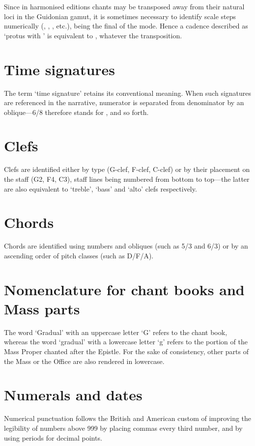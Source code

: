 Since in harmonised editions chants may be transposed away from their natural loci in the Guidonian gamut, it is sometimes necessary to identify scale steps numerically (, , , etc.),  being the final of the mode.
Hence a cadence described as `protus  \rightarrow{}  with \kern 1pt\sharp{}' is equivalent to , whatever the transposition.



\section*{Time signatures}
The term `time signature' retains its conventional meaning. When such signatures are referenced in the narrative, numerator is separated from denominator by an oblique---6/8 therefore stands for , and so forth.

\section*{Clefs}
Clefs are identified either by type (G-clef, F-clef, C-clef) or by their placement on the staff (G2, F4, C3), staff lines being numbered from bottom to top---the latter are also equivalent to `treble', `bass' and `alto' clefs respectively.

\section*{Chords}
Chords are identified using numbers and obliques (such as 5/3 and 6/3) or by an ascending order of pitch classes (such as D/F/A).

\section*{Nomenclature for chant books and Mass parts}
The word `Gradual' with an uppercase letter `G' refers to the chant book, whereas the word `gradual' with a lowercase letter `g' refers to the portion of the Mass Proper chanted after the Epistle.
For the sake of consistency, other parts of the Mass or the Office are also rendered in lowercase.

\section*{Numerals and dates}
Numerical punctuation follows the British and American custom of improving the legibility of numbers above 999 by placing commas every third number, and by using periods for decimal points.

